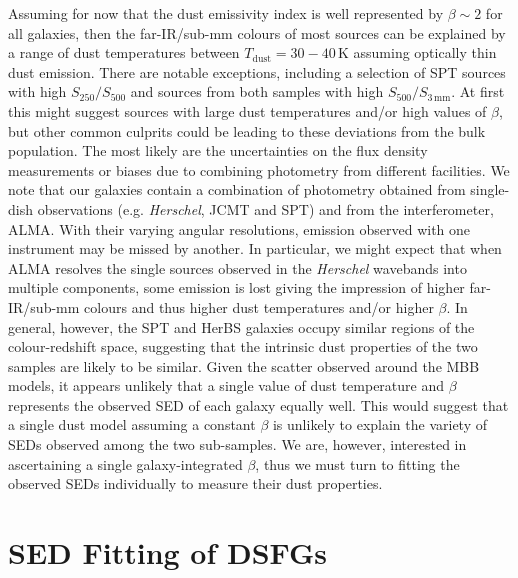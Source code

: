 Assuming for now that the dust emissivity index is well represented by $\beta \sim 2$ for all galaxies, then the far-IR/sub-mm colours of most sources can be explained by a range of dust temperatures between $T_{\textrm{dust}} = 30 - 40\,$K assuming optically thin dust emission. There are notable exceptions, including a selection of SPT sources with high $S_{250}/S_{500}$ and sources from both samples with high $S_{500}/S_{3\,\textrm{mm}}$. At first this might suggest sources with large dust temperatures and/or high values of $\beta$, but other common culprits could be leading to these deviations from the bulk population. The most likely are the uncertainties on the flux density measurements or biases due to combining photometry from different facilities. We note that our galaxies contain a combination of photometry obtained from single-dish observations (e.g. \textit{Herschel}, JCMT and SPT) and from the interferometer, ALMA. With their varying angular resolutions, emission observed with one instrument may be missed by another. In particular, we might expect that when ALMA resolves the single sources observed in the \textit{Herschel} wavebands into multiple components, some emission is lost giving the impression of higher far-IR/sub-mm colours and thus higher dust temperatures and/or higher $\beta$. In general, however, the SPT and HerBS galaxies occupy similar regions of the colour-redshift space, suggesting that the intrinsic dust properties of the two samples are likely to be similar. Given the scatter observed around the MBB models, it appears unlikely that a single value of dust temperature and $\beta$ represents the observed SED of each galaxy equally well. This would suggest that a single dust model assuming a constant $\beta$ is unlikely to explain the variety of SEDs observed among the two sub-samples. We are, however, interested in ascertaining a single galaxy-integrated $\beta$, thus we must turn to fitting the observed SEDs individually to measure their dust properties.

\section{SED Fitting of DSFGs}


